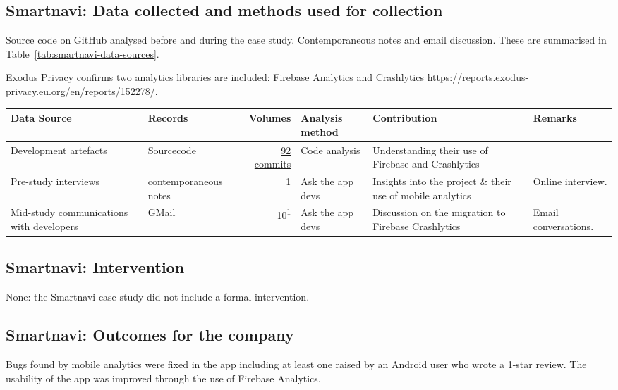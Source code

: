 \subsection{Smartnavi: Data collected and methods used for collection}
Source code on GitHub analysed before and during the case study. Contemporaneous notes and email discussion. These are summarised in Table~\ref{tab:smartnavi-data-sources}.

Exodus Privacy confirms two analytics libraries are included: Firebase Analytics and Crashlytics \url{https://reports.exodus-privacy.eu.org/en/reports/152278/}.


\begin{table*}
    \centering
    \footnotesize
    \tabcolsep=0.12cm
    \begin{tabular}{>{\raggedright}p{3cm}p{2.4cm}r>{\raggedright}p{2.1cm}>{\raggedright\arraybackslash}p{3cm}>{\raggedright\arraybackslash}p{2.2cm}}
        Data Source & Records & Volumes & Analysis method & Contribution & Remarks \\
        \toprule
        Development artefacts & Sourcecode\footnotemark & \href{https://github.com/Phantast/smartnavi/commits/master}{92 commits} & Code analysis & Understanding their use of Firebase and Crashlytics & \\
         Pre-study interviews & contemporaneous notes & 1 & Ask the app devs & Insights into the project \& their use of mobile analytics & Online interview. \\
         Mid-study communications with developers & GMail & 10\textsuperscript{1} & Ask the app devs & Discussion on the migration to Firebase Crashlytics & Email conversations. \\
         \bottomrule
    \end{tabular}
    \caption{Smartnavi: data sources}
    \label{tab:smartnavi-data-sources}
\end{table*}


\subsection{Smartnavi: Intervention}
None: the Smartnavi case study did not include a formal intervention.

\subsection{Smartnavi: Outcomes for the company}
Bugs found by mobile analytics were fixed in the app including at least one raised by an Android user who wrote a 1-star review. The usability of the app was improved through the use of Firebase Analytics. 

